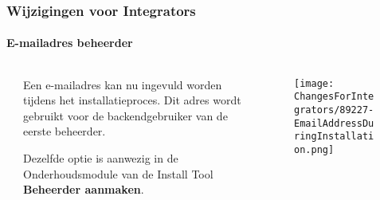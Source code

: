 \begin{frame}[fragile]
	\frametitle{Wijzigingen voor Integrators}
	\framesubtitle{E-mailadres beheerder}

	\begin{columns}[T]
		\begin{column}{.04\textwidth}
		\end{column}
		\begin{column}{.38\textwidth}

			Een e-mailadres kan nu ingevuld worden tijdens het installatieproces.
			Dit adres wordt gebruikt voor de backendgebruiker van de eerste beheerder.

			\vspace{0.2cm}

			Dezelfde optie is aanwezig in de Onderhoudsmodule van de Install Tool
			\textbf{Beheerder aanmaken}.

		\end{column}
		\begin{column}{.58\textwidth}
			\vspace{-0.3cm}
			\begin{figure}
				\texttt{[image: ChangesForIntegrators/89227-EmailAddressDuringInstallation.png]}
			\end{figure}
		\end{column}
	\end{columns}

\end{frame}



